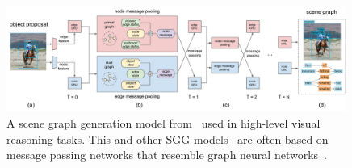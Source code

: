 
\begin{figure}[thbp]
	\centering
	\includegraphics[width=0.99\textwidth,align=c,trim={0 2.1cm 0cm 0.2cm},clip]{figs/stanford_network.pdf}
	\caption{\small A scene graph generation model from~\citep{xu2017scene} used in high-level visual reasoning tasks. This and other SGG models~\citep{yang2018graph} are often based on message passing networks that resemble graph neural networks~\citep{gilmer2017neural,battaglia2018relational}.}
	\label{fig:overview_sg}
\end{figure}

